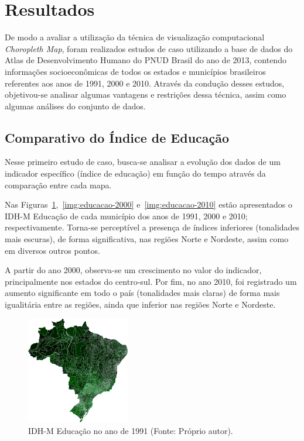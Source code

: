 \documentclass[conference]{IEEEtran}
\begin{document}
\section{Resultados}
\label{section:resultados}

De modo a avaliar a utilização da técnica de visualização computacional \textit{Choropleth Map}, foram realizados estudos de caso utilizando a base de dados do Atlas de Desenvolvimento Humano do PNUD Brasil do ano de 2013, contendo informações socioeconômicas de todos os estados e municípios brasileiros referentes aos anos de 1991, 2000 e 2010. Através da condução desses estudos, objetivou-se analisar algumas vantagens e restrições dessa técnica, assim como algumas análises do conjunto de dados.

\subsection{Comparativo do Índice de Educação}

Nesse primeiro estudo de caso, busca-se analisar a evolução dos dados de um indicador específico (índice de educação) em função do tempo através da comparação entre cada mapa.

Nas Figuras~\ref{img:educacao-1991},~\ref{img:educacao-2000} e~\ref{img:educacao-2010} estão apresentados o IDH-M Educação de cada município dos anos de 1991, 2000 e 2010; respectivamente. Torna-se perceptível a presença de índices inferiores (tonalidades mais escuras), de forma significativa, nas regiões Norte e Nordeste, assim como em diversos outros pontos. 

A partir do ano 2000, observa-se um crescimento no valor do indicador, principalmente nos estados do centro-sul. Por fim, no ano 2010, foi registrado um aumento significante em todo o país (tonalidades mais claras) de forma mais igualitária entre as regiões, ainda que inferior nas regiões Norte e Nordeste.

\begin{figure}[!ht]
\centering
\includegraphics[width=0.40\textwidth]{educacao-1991.png}
\caption{IDH-M Educação no ano de 1991 (Fonte: Próprio autor).}
\label{img:educacao-1991}
\end{figure}
\end{document}
